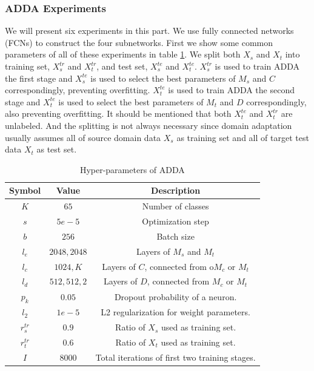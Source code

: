 \documentclass[conference]{IEEEtran}
\begin{document}
\subsubsection{ADDA Experiments}
We will present six experiments in this part. We use fully connected networks (FCNs) to construct the four subnetworks. First we show some common parameters of all of these experiments in table \ref{tab:SymADDA}. We split both $X_s$ and $X_t$ into training set, $X^{tr}_s$ and $X^{tr}_t$, and test set, $X^{te}_s$ and $X^{te}_t$. $X^{tr}_s$ is used to train ADDA the first stage and $X^{te}_s$ is used to select the best parameters of $M_s$ and $C$ correspondingly, preventing overfitting. $X^{te}_t$ is used to train ADDA the second stage and $X^{te}_t$ is used to select the best parameters of $M_t$ and $D$ correspondingly, also preventing overfitting. It should be mentioned that both $X^{te}_t$ and $X^{tr}_t$ are unlabeled. And the splitting is not always necessary since domain adaptation usually assumes all of source domain data $X_s$ as training set and all of target test data $X_t$ as test set.
 \begin{table}[h]
	\centering
	\caption{Hyper-parameters of ADDA}
	\label{tab:SymADDA}
	\begin{tabular}{ccc}
		\hline
		Symbol & Value & Description \\
		\hline
		\hline
        $K$ & $65$ & Number of classes \\
		$s$ & $5e-5$ & Optimization step \\
		$b$ & $256$ & Batch size \\
		$l_e$ & ${2048,2048}$ & Layers of $M_s$ and $M_t$ \\
		$l_c$ & ${1024,K}$ & Layers of $C$, connected from o$M_c$ or $M_t$  \\
		$l_d$ & ${512,512,2}$ & Layers of $D$, connected from $M_c$ or $M_t$ \\
        $p_k$ & $0.05$ & Dropout probability of a neuron. \\
        $l_2$ & $1e-5$ & L2 regularization for weight parameters.  \\
        $r^{tr}_{s}$ & $0.9$ & Ratio of $X_s$ used as training set.\\
        $r^{tr}_{t}$ & $0.6$ & Ratio of $X_t$ used as training set.  \\
        $I$ & $8000$ & Total iterations of first two training stages.   \\
		\hline
	\end{tabular}
\end{table}
\end{document}
